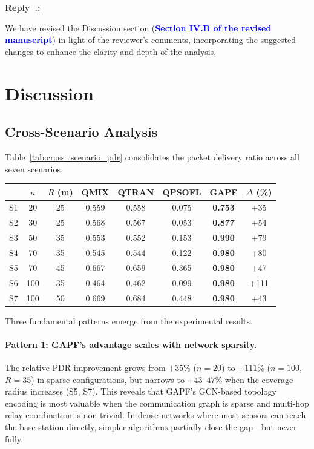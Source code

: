 \documentclass[11pt]{article}
\newcounter{reviewer}
\newcounter{replyctr}[reviewer]
\renewcommand{\thereplyctr}{\thereviewer.\arabic{replyctr}}
\newenvironment{reply}
  {\refstepcounter{replyctr}%
   \addtocounter{replyctr}{-1}%
   \medskip\noindent
   \begin{sf}\textbf{Reply~\thereplyctr:}\ }
  {\addtocounter{replyctr}{1}%
   \medskip\end{sf}}
\begin{document}
\begin{refsection}
\begin{mdframed}[style=Resp]
\begin{reply}

    We have revised the Discussion section (\textbf{\textcolor{blue}{Section IV.B of the revised manuscript}}) in light of the reviewer’s comments, incorporating the suggested changes to enhance the clarity and depth of the analysis.

    \section{Discussion}
\label{sec:discussion}

\subsection{Cross-Scenario Analysis}

Table~\ref{tab:cross_scenario_pdr} consolidates the packet delivery ratio across all seven scenarios.

\begin{center}
\label{tab:cross_scenario_pdr}
\begin{tabular}{lccccccc}
\toprule
 & $n$ & $R$ (m) & QMIX & QTRAN & QPSOFL & GAPF & $\Delta$ (\%) \\
\midrule
S1 & 20  & 25 & 0.559 & 0.558 & 0.075 & \textbf{0.753} & +35 \\
S2 & 30  & 25 & 0.568 & 0.567 & 0.053 & \textbf{0.877} & +54 \\
S3 & 50  & 35 & 0.553 & 0.552 & 0.153 & \textbf{0.990} & +79 \\
S4 & 70  & 35 & 0.545 & 0.544 & 0.122 & \textbf{0.980} & +80 \\
S5 & 70  & 45 & 0.667 & 0.659 & 0.365 & \textbf{0.980} & +47 \\
S6 & 100 & 35 & 0.464 & 0.462 & 0.099 & \textbf{0.980} & +111 \\
S7 & 100 & 50 & 0.669 & 0.684 & 0.448 & \textbf{0.980} & +43 \\
\bottomrule
\end{tabular}
\end{center}

Three fundamental patterns emerge from the experimental results.

\paragraph{Pattern 1: GAPF's advantage scales with network sparsity.}
The relative PDR improvement grows from $+35\%$ ($n{=}20$) to $+111\%$ ($n{=}100$, $R{=}35$) in sparse configurations, but narrows to $+43\text{--}47\%$ when the coverage radius increases (S5, S7). This reveals that GAPF's GCN-based topology encoding is most valuable when the communication graph is sparse and multi-hop relay coordination is non-trivial. In dense networks where most sensors can reach the base station directly, simpler algorithms partially close the gap---but never fully.


\end{reply}
\end{mdframed}
\end{refsection}
\end{document}
